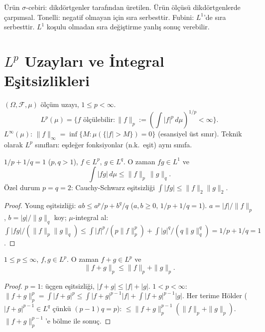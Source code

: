 \begin{mikroozet}[§1.8 özeti]
Ürün $\sigma$-cebiri: dikdörtgenler tarafından üretilen. Ürün ölçüsü dikdörtgenlerde
çarpımsal. Tonelli: negatif olmayan için sıra serbesttir. Fubini: $L^1$'de sıra serbesttir.
$L^1$ koşulu olmadan sıra değiştirme yanlış sonuç verebilir.
\end{mikroozet}


\section{$L^p$ Uzayları ve İntegral Eşitsizlikleri}
\label{sec:lp_uzaylari}

\begin{tanim}[$L^p$ Uzayı]
\label{def:lp_uzay}
$(\Omega, \mathcal{F}, \mu)$ ölçüm uzayı, $1 \leq p < \infty$.
\[
  L^p(\mu) = \{f \text{ ölçülebilir} : \|f\|_p := \left(\int |f|^p \, d\mu\right)^{1/p} < \infty\}.
\]
$L^\infty(\mu)$: $\|f\|_\infty = \inf\{M : \mu(\{|f| > M\}) = 0\}$ (esansiyel üst sınır).
Teknik olarak $L^p$ sınıfları: eşdeğer fonksiyonlar (n.k.\ eşit) aynı sınıfa.
\end{tanim}

\begin{teorem}
\label{thm:holder}
$1/p + 1/q = 1$ ($p,q > 1$), $f \in L^p$, $g \in L^q$. O zaman $fg \in L^1$ ve
\[
  \int |fg| \, d\mu \leq \|f\|_p \, \|g\|_q.
\]
Özel durum $p = q = 2$: Cauchy-Schwarz eşitsizliği $\int|fg| \leq \|f\|_2\|g\|_2$.
\end{teorem}

\begin{proof}
Young eşitsizliği: $ab \leq a^p/p + b^q/q$ ($a,b \geq 0$, $1/p+1/q=1$).
$a = |f|/\|f\|_p$, $b = |g|/\|g\|_q$ koy; $\mu$-integral al:
$\int |fg|/(\|f\|_p\|g\|_q) \leq \int |f|^p/(p\|f\|_p^p) + \int|g|^q/(q\|g\|_q^q) = 1/p + 1/q = 1$.
\end{proof}

\begin{teorem}
\label{thm:minkowski}
$1 \leq p \leq \infty$, $f, g \in L^p$. O zaman $f + g \in L^p$ ve
\[
  \|f + g\|_p \leq \|f\|_p + \|g\|_p.
\]
\end{teorem}

\begin{proof}
$p=1$: üçgen eşitsizliği, $|f+g| \leq |f| + |g|$.
$1 < p < \infty$: $\|f+g\|_p^p = \int|f+g|^p \leq \int|f+g|^{p-1}|f| + \int|f+g|^{p-1}|g|$.
Her terime Hölder ($|f+g|^{p-1} \in L^q$ çünkü $(p-1)q = p$):
$\leq \|f+g\|_p^{p-1}(\|f\|_p + \|g\|_p)$. $\|f+g\|_p^{p-1}$'e bölme ile sonuç.
\end{proof}

